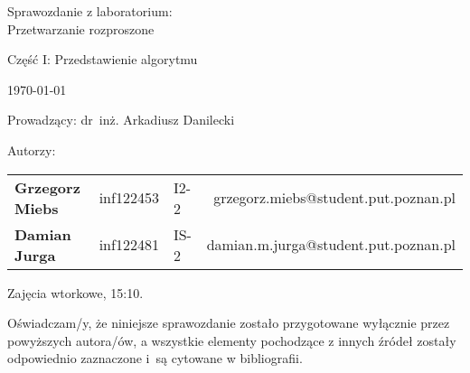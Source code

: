 \thispagestyle{empty} %

\begin{center}
{\large{Sprawozdanie z laboratorium:\\
Przetwarzanie rozproszone}}

\vspace{3ex}

Część I: Przedstawienie algorytmu

\vspace{3ex}
{\footnotesize\today}

\end{center}


\vspace{10ex}

Prowadzący: dr~inż. Arkadiusz Danilecki

\vspace{5ex}

Autorzy:
\begin{tabular}{lllr}
\textbf{Grzegorz Miebs} & inf122453 & I2-2 & grzegorz.miebs@student.put.poznan.pl \\
\textbf{Damian Jurga} & inf122481 & IS-2 & damian.m.jurga@student.put.poznan.pl \\
\end{tabular}

\vspace{5ex}

Zajęcia wtorkowe, 15:10.

\vspace{35ex}

\noindent Oświadczam/y, że niniejsze sprawozdanie zostało przygotowane wyłącznie przez powyższych autora/ów,
a wszystkie elementy pochodzące z innych źródeł zostały odpowiednio zaznaczone i~są cytowane w bibliografii.  

\newpage

